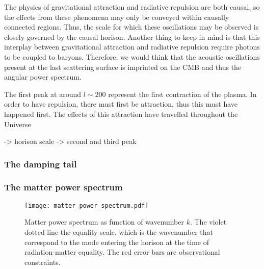         The physics of gravitational attraction and radiative repulsion are both causal, so the effects from these phenomena may only be conveyed within causally connected regions. Thus, the scale for which these oscillations may be observed is closely governed by the causal horison. Another thing to keep in mind is that this interplay between gravitational attraction and radiative repulsion require photons to be coupled to baryons. Therefore, we would think that the acoustic oscillations present at the last scattering surface is imprinted on the CMB and thus the angular power spectrum.

        The first peak at around $l\sim200$ represent the first contraction of the plasma. In order to have repulsion, there must first be attraction, thus this must have happened first. The effects of this attraction have travelled throughout the Universe 

        -> horison scale
        -> second and third peak

    \subsubsection{The damping tail}


    \subsubsection{The matter power spectrum}
    
    \begin{figure}
        \texttt{[image: matter\_power\_spectrum.pdf]}
        \caption{Matter power spectrum as function of wavenumber $k$. The violet dotted line the equality scale, which is the wavenumber that correspond to the mode entering the horison at the time of radiation-matter equality. The red error bars are observational constraints.}
        \label{fig:m4:matter_power_spectrum}
    \end{figure}